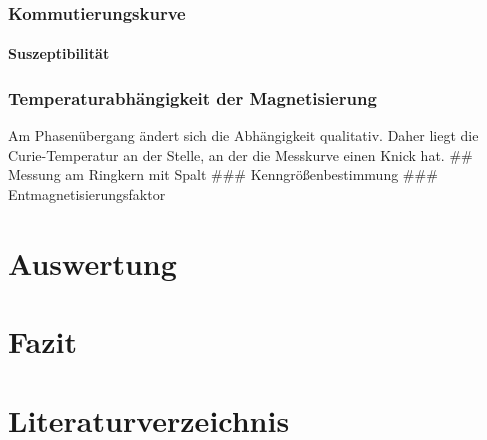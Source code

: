 \documentclass[12pt,a4paper]{scrartcl}
\numberwithin{equation}{section} %
\renewcommand{\[}{} %
\renewcommand{\]}{\noindent} %
\begin{document}
\hypertarget{kommutierungskurve}{%
\subsubsection{Kommutierungskurve}\label{kommutierungskurve}}

\hypertarget{suszeptibilituxe4t}{%
\paragraph{Suszeptibilität}\label{suszeptibilituxe4t}}

\hypertarget{temperaturabhuxe4ngigkeit-der-magnetisierung}{%
\subsubsection{Temperaturabhängigkeit der
Magnetisierung}\label{temperaturabhuxe4ngigkeit-der-magnetisierung}}

Am Phasenübergang ändert sich die Abhängigkeit qualitativ. Daher liegt
die Curie-Temperatur an der Stelle, an der die Messkurve einen Knick
hat. \#\# Messung am Ringkern mit Spalt \#\#\# Kenngrößenbestimmung
\#\#\# Entmagnetisierungsfaktor

\hypertarget{auswertung}{%
\section{Auswertung}\label{auswertung}}

\hypertarget{fazit}{%
\section{Fazit}\label{fazit}}

\hypertarget{literaturverzeichnis}{%
\section{Literaturverzeichnis}\label{literaturverzeichnis}}
\end{document}
